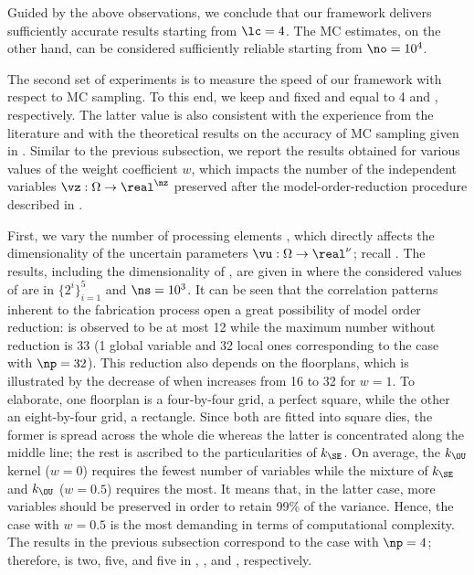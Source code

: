 Guided by the above observations, we conclude that our framework delivers
sufficiently accurate results starting from $\lc = 4$. The \ac{MC} estimates, on
the other hand, can be considered sufficiently reliable starting from $\no =
10^4$.


The second set of experiments is to measure the speed of our framework with
respect to \ac{MC} sampling. To this end, we keep \lc and \no fixed and equal to
4 and , respectively. The latter value is also consistent with the
experience from the literature \cite{ghanta2006, bhardwaj2008, huang2009a,
shen2009, lee2013} and with the theoretical results on the accuracy of \ac{MC}
sampling given in \cite{diaz-emparanza2002}. Similar to the previous subsection,
we report the results obtained for various values of the weight coefficient $w$,
which impacts the number of the independent variables $\vz: \Omega \to
\real^\nz$ preserved after the model-order-reduction procedure described in
.

First, we vary the number of processing elements \np, which directly affects the
dimensionality of the uncertain parameters $\vu: \Omega \to \real^\nu$; recall
. The results, including the dimensionality
\nz of \vz, are given in  where the
considered values of \np are in $\{ 2^i \}_{i = 1}^5$ and $\ns = 10^3$. It can
be seen that the correlation patterns inherent to the fabrication process
\cite{cheng2011} open a great possibility of model order reduction: \nz is
observed to be at most 12 while the maximum number without reduction is 33 (1
global variable and 32 local ones corresponding to the case with $\np = 32$).
This reduction also depends on the floorplans, which is illustrated by the
decrease of \nz when \np increases from 16 to 32 for $w = 1$. To elaborate, one
floorplan is a four-by-four grid, a perfect square, while the other an
eight-by-four grid, a rectangle. Since both are fitted into square dies, the
former is spread across the whole die whereas the latter is concentrated along
the middle line; the rest is ascribed to the particularities of $k_\SE$. On
average, the $k_\OU$ kernel ($w = 0$) requires the fewest number of variables
while the mixture of $k_\SE$ and $k_\OU$ ($w = 0.5$) requires the most. It means
that, in the latter case, more variables should be preserved in order to retain
99\% of the variance. Hence, the case with $w = 0.5$ is the most demanding in
terms of computational complexity. The results in the previous subsection
correspond to the case with $\np = 4$; therefore, \nz is two, five, and five in
, , and
, respectively.

